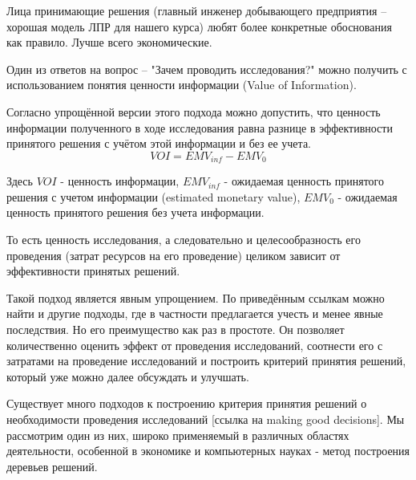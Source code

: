 Лица принимающие решения (главный инженер добывающего предприятия -- хорошая модель ЛПР для нашего курса) любят более конкретные обоснования как правило. Лучше всего экономические.

Один из ответов на вопрос -- "Зачем проводить исследования?" можно получить с использованием понятия ценности информации (Value of Information). 


Согласно упрощённой версии этого подхода можно допустить, что ценность информации полученного в ходе исследования равна разнице в эффективности принятого решения с учётом этой информации и без ее учета. 
$$VOI = EMV_{inf}-EMV_{0}$$

Здесь $VOI$ - ценность информации, $EMV_{inf}$ - ожидаемая ценность принятого решения с учетом информации (estimated monetary value), $EMV_{0}$ - ожидаемая ценность принятого решения без учета информации.

То есть ценность исследования, а следовательно и целесообразность его проведения (затрат ресурсов на его проведение) целиком зависит от эффективности принятых решений. 

Такой подход является явным упрощением. По приведённым ссылкам можно найти и другие подходы, где в частности предлагается учесть и менее явные последствия. Но его преимущество как раз в простоте. Он позволяет количественно оценить эффект от проведения исследований, соотнести его с затратами на проведение исследований и построить критерий принятия решений, который уже можно далее обсуждать и улучшать. 


Существует много подходов к построению критерия принятия решений о необходимости проведения исследований [ссылка на making good decisions]. Мы рассмотрим один из них, широко применяемый в различных областях деятельности, особенной в экономике и компьютерных науках - метод построения деревьев решений. \cite{AL_appl_patt_2007}

